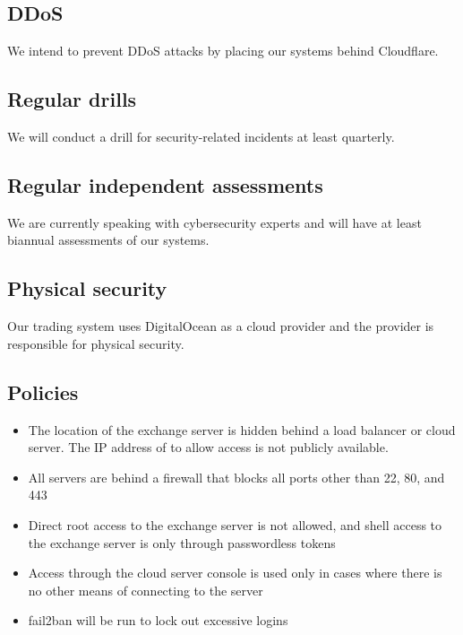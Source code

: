 \subsection{DDoS}
We intend to prevent DDoS attacks by placing our systems behind
Cloudflare.

\subsection{Regular drills}
We will conduct a drill for security-related incidents at least quarterly.


\subsection{Regular independent assessments}
We are currently speaking with cybersecurity experts and will have at
least biannual assessments of our systems.


\subsection{Physical security}
Our trading system uses DigitalOcean as a cloud provider and the
provider is responsible for physical security.


\subsection{Policies}
\begin{itemize}
  \item The location of the exchange server is hidden behind a load
  balancer or cloud server.  The IP address of to allow access is not
  publicly available.
  \item All servers are behind a firewall that blocks all ports other
    than 22, 80, and 443
  \item Direct root access to the exchange server is not allowed, and
    shell access to the exchange server is only through passwordless
    tokens
  \item Access through the cloud server console is used only in
    cases where there is no other means of connecting to the server
  \item fail2ban will be run to lock out excessive logins 
\end{itemize}

